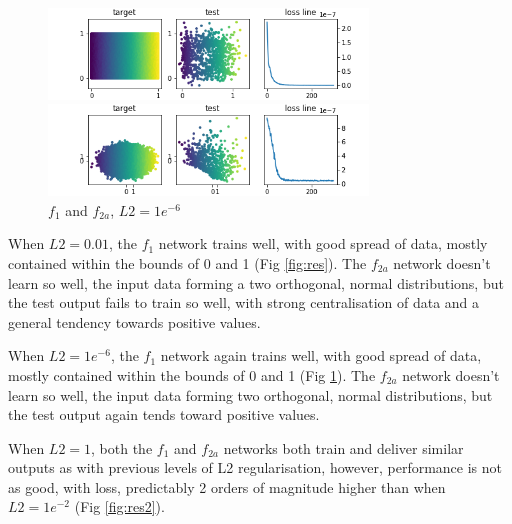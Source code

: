 \documentclass{article}
\begin{document}
\begin{figure}[htb]
\begin{minipage}[b]{1\linewidth}
  \centering
  \centerline{\includegraphics[width=8.5cm]{f1_1e-06_300_1000}}
\end{minipage}
%
\begin{minipage}[b]{1\linewidth}
  \centering
  \centerline{\includegraphics[width=8.5cm]{f2a_1e-06_300_1000}}
\end{minipage}
%
\caption{$f_1$ and $f_{2a}$, $L2 = 1e^{-6}$}
\label{fig:res1}
%
\end{figure}
When $L2 = 0.01$, the $f_1$ network trains well, with good spread of data, mostly contained within the bounds of 0 and 1 (Fig \ref{fig:res}).  The $f_{2a}$ network doesn't learn so well, the input data forming a two orthogonal, normal distributions, but the test output fails to train so well, with strong centralisation of data and a general tendency towards positive values.

When $L2 = 1e^{-6}$, the $f_1$ network again trains well, with good spread of data, mostly contained within the bounds of 0 and 1 (Fig \ref{fig:res1}).  The $f_{2a}$ network doesn't learn so well, the input data forming two orthogonal, normal distributions, but the test output again tends toward positive values.

When $L2 = 1$, both the $f_1$ and $f_{2a}$ networks both train and deliver similar outputs as with previous levels of L2 regularisation, however, performance is not as good, with loss, predictably 2 orders of magnitude higher than when $L2 = 1e^{-2}$ (Fig \ref{fig:res2}).
\end{document}
